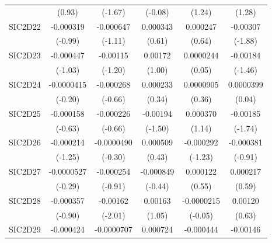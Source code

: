 \begin{table}[htbp]
\begin{tabular}{l*{5}{c}}
            &      (0.93)         &     (-1.67)         &     (-0.08)         &      (1.24)         &      (1.28)         \\
SIC2D22     &   -0.000319         &   -0.000647         &    0.000343         &    0.000247         &    -0.00307         \\
            &     (-0.99)         &     (-1.11)         &      (0.61)         &      (0.64)         &     (-1.88)         \\
SIC2D23     &   -0.000447         &    -0.00115         &     0.00172         &   0.0000244         &    -0.00184         \\
            &     (-1.03)         &     (-1.20)         &      (1.00)         &      (0.05)         &     (-1.46)         \\
SIC2D24     &  -0.0000415         &   -0.000268         &    0.000233         &   0.0000905         &   0.0000399         \\
            &     (-0.20)         &     (-0.66)         &      (0.34)         &      (0.36)         &      (0.04)         \\
SIC2D25     &   -0.000158         &   -0.000226         &    -0.00194         &    0.000370         &    -0.00185         \\
            &     (-0.63)         &     (-0.66)         &     (-1.50)         &      (1.14)         &     (-1.74)         \\
SIC2D26     &   -0.000214         &  -0.0000490         &    0.000509         &   -0.000292         &   -0.000381         \\
            &     (-1.25)         &     (-0.30)         &      (0.43)         &     (-1.23)         &     (-0.91)         \\
SIC2D27     &  -0.0000527         &   -0.000254         &   -0.000849         &    0.000122         &    0.000217         \\
            &     (-0.29)         &     (-0.91)         &     (-0.44)         &      (0.55)         &      (0.59)         \\
SIC2D28     &   -0.000357         &    -0.00162\sym{*}  &     0.00163         &  -0.0000215         &     0.00120         \\
            &     (-0.90)         &     (-2.01)         &      (1.05)         &     (-0.05)         &      (0.63)         \\
SIC2D29     &   -0.000424         &  -0.0000707         &    0.000724         &   -0.000444         &    -0.00146         \\

\end{tabular}
\end{table}
